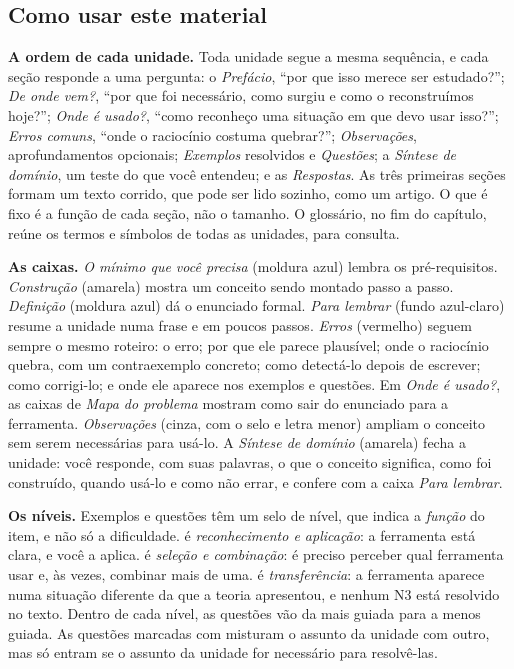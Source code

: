 \subsection*{Como usar este material}
\textbf{A ordem de cada unidade.} Toda unidade segue a mesma sequência, e cada seção responde a uma pergunta: o \emph{Prefácio}, \enquote{por que isso merece ser estudado?}; \emph{De onde vem?}, \enquote{por que foi necessário, como surgiu e como o reconstruímos hoje?}; \emph{Onde é usado?}, \enquote{como reconheço uma situação em que devo usar isso?}; \emph{Erros comuns}, \enquote{onde o raciocínio costuma quebrar?}; \emph{Observações}, aprofundamentos opcionais; \emph{Exemplos} resolvidos e \emph{Questões}; a \emph{Síntese de domínio}, um teste do que você entendeu; e as \emph{Respostas}. As três primeiras seções formam um texto corrido, que pode ser lido sozinho, como um artigo. O que é fixo é a função de cada seção, não o tamanho. O glossário, no fim do capítulo, reúne os termos e símbolos de todas as unidades, para consulta.

\textbf{As caixas.} \emph{O mínimo que você precisa} (moldura azul) lembra os pré-requisitos. \emph{Construção} (amarela) mostra um conceito sendo montado passo a passo. \emph{Definição} (moldura azul) dá o enunciado formal. \emph{Para lembrar} (fundo azul-claro) resume a unidade numa frase e em poucos passos. \emph{Erros} (vermelho) seguem sempre o mesmo roteiro: o erro; por que ele parece plausível; onde o raciocínio quebra, com um contraexemplo concreto; como detectá-lo depois de escrever; como corrigi-lo; e onde ele aparece nos exemplos e questões. Em \emph{Onde é usado?}, as caixas de \emph{Mapa do problema} mostram como sair do enunciado para a ferramenta. \emph{Observações} (cinza, com o selo \opcional{} e letra menor) ampliam o conceito sem serem necessárias para usá-lo. A \emph{Síntese de domínio} (amarela) fecha a unidade: você responde, com suas palavras, o que o conceito significa, como foi construído, quando usá-lo e como não errar, e confere com a caixa \emph{Para lembrar}.

\textbf{Os níveis.} Exemplos e questões têm um selo de nível, que indica a \emph{função} do item, e não só a dificuldade.  é \emph{reconhecimento e aplicação}: a ferramenta está clara, e você a aplica.  é \emph{seleção e combinação}: é preciso perceber qual ferramenta usar e, às vezes, combinar mais de uma.  é \emph{transferência}: a ferramenta aparece numa situação diferente da que a teoria apresentou, e nenhum N3 está resolvido no texto. Dentro de cada nível, as questões vão da mais guiada para a menos guiada. As questões marcadas com \integradora{} misturam o assunto da unidade com outro, mas só entram se o assunto da unidade for necessário para resolvê-las.

